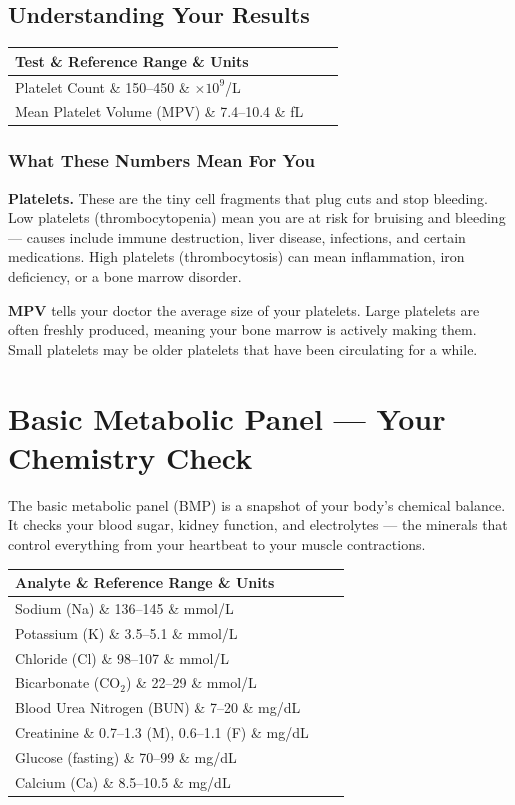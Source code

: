 \subsection{Understanding Your Results}

\begin{longtable}{@{}lll@{}}
\toprule
\textbf{Test} \& \textbf{Reference Range} \& \textbf{Units} \\
\midrule
Platelet Count \& 150--450 \& $\times 10^9$/L \\
Mean Platelet Volume (MPV) \& 7.4--10.4 \& fL \\
\bottomrule
\end{longtable}

\subsubsection{What These Numbers Mean For You}

\textbf{Platelets.} These are the tiny cell fragments that plug cuts and stop bleeding. Low platelets (thrombocytopenia) mean you are at risk for bruising and bleeding --- causes include immune destruction, liver disease, infections, and certain medications. High platelets (thrombocytosis) can mean inflammation, iron deficiency, or a bone marrow disorder.

\textbf{MPV} tells your doctor the average size of your platelets. Large platelets are often freshly produced, meaning your bone marrow is actively making them. Small platelets may be older platelets that have been circulating for a while.

\clearpage
\section{Basic Metabolic Panel --- Your Chemistry Check}

The basic metabolic panel (BMP) is a snapshot of your body's chemical balance. It checks your blood sugar, kidney function, and electrolytes --- the minerals that control everything from your heartbeat to your muscle contractions.

\begin{longtable}{@{}lll@{}}
\toprule
\textbf{Analyte} \& \textbf{Reference Range} \& \textbf{Units} \\
\midrule
Sodium (Na) \& 136--145 \& mmol/L \\
Potassium (K) \& 3.5--5.1 \& mmol/L \\
Chloride (Cl) \& 98--107 \& mmol/L \\
Bicarbonate (CO$_2$) \& 22--29 \& mmol/L \\
Blood Urea Nitrogen (BUN) \& 7--20 \& mg/dL \\
Creatinine \& 0.7--1.3 (M), 0.6--1.1 (F) \& mg/dL \\
Glucose (fasting) \& 70--99 \& mg/dL \\
Calcium (Ca) \& 8.5--10.5 \& mg/dL \\
\bottomrule
\end{longtable}

